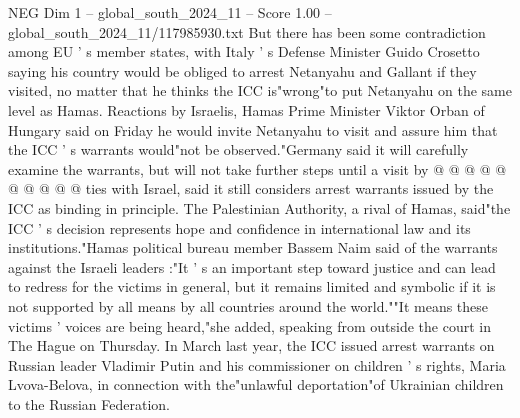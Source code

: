 \begin{textsample}{NEG Dim 1 – global\_south\_2024\_11 – Score 1.00 – global\_south\_2024\_11/117985930.txt}
But there has been some contradiction among EU ' s member states, with Italy ' s Defense Minister Guido Crosetto saying his country would be obliged to arrest Netanyahu and Gallant if they visited, no matter that he thinks the ICC is"wrong"to put Netanyahu on the same level as Hamas.
Reactions by Israelis, Hamas Prime Minister Viktor Orban of Hungary said on Friday he would invite Netanyahu to visit and assure him that the ICC ' s warrants would"not be observed."Germany said it will carefully examine the warrants, but will not take further steps until a visit by @ @ @ @ @ @ @ @ @ @ ties with Israel, said it still considers arrest warrants issued by the ICC as binding in principle.
The Palestinian Authority, a rival of Hamas, said"the ICC ' s decision represents hope and confidence in international law and its institutions."Hamas political bureau member Bassem Naim said of the warrants against the Israeli leaders :"It ' s an important step toward justice and can lead to redress for the victims in general, but it remains limited and symbolic if it is not supported by all means by all countries around the world.""It means these victims ' voices are being heard,"she added, speaking from outside the court in The Hague on Thursday.
In March last year, the ICC issued arrest warrants on Russian leader Vladimir Putin and his commissioner on children ' s rights, Maria Lvova-Belova, in connection with the"unlawful deportation"of Ukrainian children to the Russian Federation.

\end{textsample}
